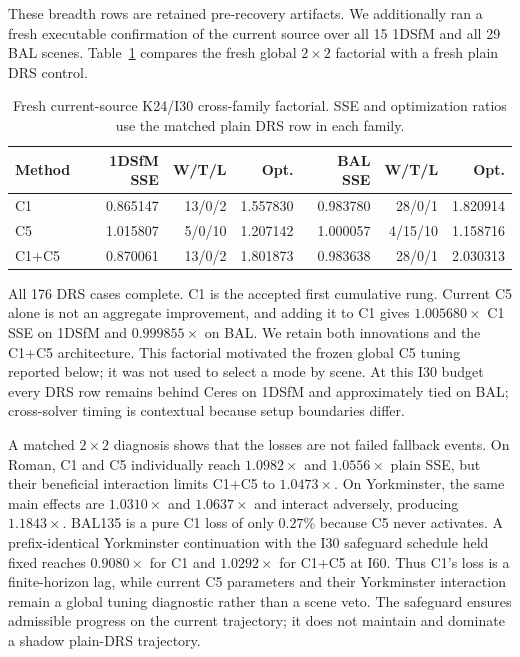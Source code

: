 These breadth rows are retained pre-recovery artifacts.  We additionally ran a
fresh executable confirmation of the current source over all 15 1DSfM and all
29 BAL scenes.  Table~\ref{tab:stage-c-fresh-cross-family} compares the fresh
global $2\times2$ factorial with a fresh plain DRS control.

\begin{table}[t]
  \centering
  \caption{Fresh current-source K24/I30 cross-family factorial.  SSE and
  optimization ratios use the matched plain DRS row in each family.}
  \label{tab:stage-c-fresh-cross-family}
  \small
  \begin{tabular}{lrrrrrr}
    \hline
    Method & 1DSfM SSE & W/T/L & Opt. & BAL SSE & W/T/L & Opt. \\
    \hline
    C1 & 0.865147 & 13/0/2 & 1.557830 & 0.983780 & 28/0/1 & 1.820914 \\
    C5 & 1.015807 & 5/0/10 & 1.207142 & 1.000057 & 4/15/10 & 1.158716 \\
    C1+C5 & 0.870061 & 13/0/2 & 1.801873 & 0.983638 & 28/0/1 & 2.030313 \\
    \hline
  \end{tabular}
\end{table}

All 176 DRS cases complete.  C1 is the accepted first cumulative rung.  Current
C5 alone is not an aggregate improvement, and adding it to C1 gives
$1.005680\times$ C1 SSE on 1DSfM and $0.999855\times$ on BAL.  We retain both
innovations and the C1+C5 architecture.  This factorial motivated the frozen
global C5 tuning reported below; it was not used to select a mode by scene.  At
this I30 budget every DRS row remains behind Ceres on 1DSfM and approximately
tied on BAL; cross-solver timing is contextual because setup boundaries differ.

A matched $2\times2$ diagnosis shows that the losses are not failed fallback
events.  On Roman, C1 and C5 individually reach $1.0982\times$ and
$1.0556\times$ plain SSE, but their beneficial interaction limits C1+C5 to
$1.0473\times$.  On Yorkminster, the same main effects are $1.0310\times$ and
$1.0637\times$ and interact adversely, producing $1.1843\times$.  BAL135 is a
pure C1 loss of only $0.27\%$ because C5 never activates.  A prefix-identical
Yorkminster continuation with the I30 safeguard schedule held fixed reaches
$0.9080\times$ for C1 and $1.0292\times$ for C1+C5 at I60.  Thus C1's loss is a
finite-horizon lag, while current C5 parameters and their Yorkminster
interaction remain a global tuning diagnostic rather than a scene veto.
The safeguard ensures admissible progress on the current trajectory; it does
not maintain and dominate a shadow plain-DRS trajectory.

